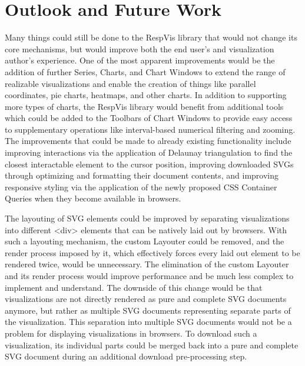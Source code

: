 \chapter{Outlook and Future Work}
\label{chap:Outlook}

Many things could still be done to the RespVis library that would not
change its core mechanisms, but would improve both the end user's and
visualization author's experience. One of the most apparent
improvements would be the addition of further Series, Charts, and
Chart Windows to extend the range of realizable visualizations and
enable the creation of things like parallel coordinates, pie charts,
heatmaps, and other charts. In addition to supporting more types of
charts, the RespVis library would benefit from additional tools which
could be added to the Toolbars of Chart Windows to provide easy access
to supplementary operations like interval-based numerical filtering
and zooming. The improvements that could be made to already existing
functionality include improving interactions via the application of
Delaunay triangulation \parencite{Delaunay,DelaunayAlgorithms} to find
the closest interactable element to the cursor position, improving
downloaded SVGs through optimizing and formatting their document
contents, and improving responsive styling via the application of the
newly proposed CSS Container Queries \parencite{CSSContainment3} when
they become available in browsers.

The layouting of SVG elements could be improved by separating
visualizations into different <div> elements that can be natively laid
out by browsers. With such a layouting mechanism, the custom Layouter
could be removed, and the render process imposed by it, which
effectively forces every laid out element to be rendered twice, would
be unnecessary. The elimination of the custom Layouter and its render
process would improve performance and be much less complex to
implement and understand. The downside of this change would be that
visualizations are not directly rendered as pure and complete SVG
documents anymore, but rather as multiple SVG documents representing
separate parts of the visualization. This separation into multiple SVG
documents would not be a problem for displaying visualizations in
browsers. To download such a visualization, its individual parts could
be merged back into a pure and complete SVG document during an
additional download pre-processing step.

